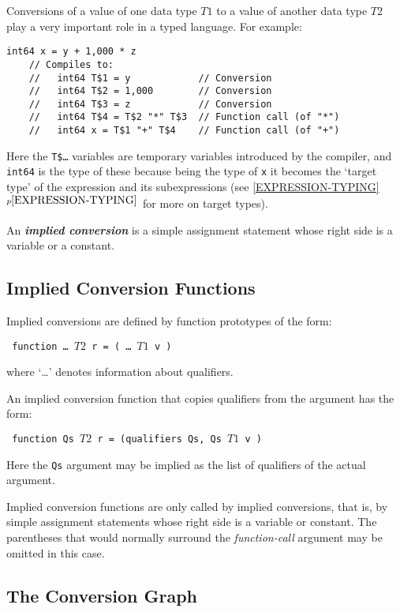\documentclass[12pt]{article}
\newcommand{\key}[1]{{\bf \em #1}\index{#1}}
\newcommand{\itemref}[1]{\ref{#1}$^{p\pageref{#1}}$}
\newenvironment{indpar}[1][0.3in]%
	{\begin{list}{}%
		     {\setlength{\itemsep}{0in}%
		      \setlength{\topsep}{0in}%
		      \setlength{\parsep}{1ex}%
		      \setlength{\labelwidth}{#1}%
		      \setlength{\leftmargin}{#1}%
		      \addtolength{\leftmargin}{\labelsep}}%
	 \item}%
	{\end{list}}
\begin{document}
Conversions of a value of one data type $T1$ to a value of another
data type $T2$ play a very important role in a typed language.
For example:
\begin{indpar}\begin{verbatim}
int64 x = y + 1,000 * z
    // Compiles to:
    //   int64 T$1 = y            // Conversion
    //   int64 T$2 = 1,000        // Conversion
    //   int64 T$3 = z            // Conversion
    //   int64 T$4 = T$2 "*" T$3  // Function call (of "*")
    //   int64 x = T$1 "+" T$4    // Function call (of "+")
\end{verbatim}\end{indpar}

Here the {\tt T\$\ldots} variables are temporary variables
introduced by the compiler, and {\tt int64} is the type
of these because being the type of {\tt x} it becomes the
`target type' of the expression and its subexpressions
(see \itemref{EXPRESSION-TYPING} for more on target types).

An \key{implied conversion} is a simple assignment statement whose
right side is a variable or a constant.

\subsection{Implied Conversion Functions}
\label{IMPLIED-CONVERSION-FUNCTIONS}

Implied conversions are defined by function prototypes of the form:
\begin{center} \tt
function \ldots{}~$T2$ r = ( \ldots{}~$T1$ v )
\end{center}
where `\ldots{}' denotes information about qualifiers.

An implied conversion function that copies qualifiers from the
argument has the form:
\begin{center} \tt
function Qs $T2$ r = (qualifiers Qs, Qs $T1$ v )
\end{center}

Here the {\tt Qs} argument may be implied as the list of
qualifiers of the actual argument.

Implied conversion functions are only called by implied conversions, that
is, by simple assignment statements whose right side is
a variable or constant.  The parentheses that would normally
surround the {\em function-call} argument may be omitted
in this case.

\subsection{The Conversion Graph}
\label{THE-CONVERSION-GRAPH}
\end{document}
